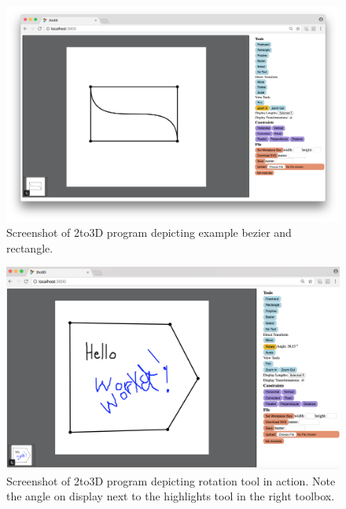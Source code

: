 \begin{figure}[H]
  \includegraphics[width=\linewidth]{screenshot.png}
  \caption{Screenshot of 2to3D program depicting example bezier and rectangle.}
  \label{fig:screenshot}
\end{figure}

\begin{figure}[H]
  \includegraphics[width=\linewidth]{screenshot2.png}
  \caption{Screenshot of 2to3D program depicting rotation tool in action. Note the angle on display next to the highlights tool in the right toolbox.}
  \label{fig:screenshot2}
\end{figure}

